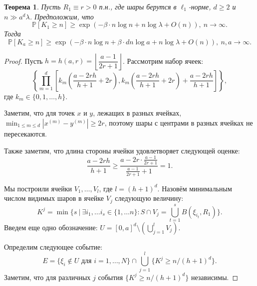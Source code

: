 \documentclass[12pt]{article}
\theoremstyle{plain}
\newtheorem{thm}{Теорема} %
\theoremstyle{definition}
\theoremstyle{remark}
\def\geq{\geqslant}
\def\leq{\leqslant}
\newcommand{\PP}{\mathbb{P}}
\begin{document}
\begin{thm}
Пусть $R_1\equiv r > 0$ п.н., где шары берутся в $\ell_1$-норме, $d\geq 2$ и $n \gg a^d\lambda$. 
Предположим, что 
\begin{equation*}
    \PP[K_1 \geq n] \geq \exp \left(-\beta\cdot n\log n + n\log\lambda + O(n)\right),\  n \to \infty.
\end{equation*}{}
Тогда 
\begin{equation*}
    \PP[K_a \geq n] \geq \exp \left(-\beta\cdot n\log n + \beta\cdot dn\log a + n\log\lambda + O(n)\right),\  n, a \to \infty.
\end{equation*}{}
\end{thm}

\begin{proof}
Пусть $h = h(a, r) = \left\lfloor\dfrac{a-1}{2r+1}\right\rfloor$. Рассмотрим набор ячеек:
\begin{equation*}
    \left\{\prod_{m = 1}^d\left[k_m\left(\dfrac{a - 2rh}{h+1} + 2r\right), k_m\left(\dfrac{a - 2rh}{h+1} + 2r\right) + \dfrac{a - 2rh}{h+1}\right]\right\},
\end{equation*}{}
где $k_m\in \{0, 1, \ldots, h\}$.

Заметим, что для точек $x$ и $y$, лежащих в разных ячейках, $\min_{1\leq m\leq d} |x^{(m)} - y^{(m)}| \geq 2r$, поэтому шары с центрами в разных ячейках не пересекаются. 

Также заметим, что длина стороны ячейки удовлетворяет следующей оценке:
\begin{equation*}
    \dfrac{a - 2rh}{h+1} \geq \dfrac{a - 2r\cdot \frac{a-1}{2r+1}}{\frac{a-1}{2r+1} + 1} = 1.
\end{equation*}{}

Мы построили ячейки $V_1, \ldots, V_l$, где $l = (h+1)^d$. Назовём минимальным числом видимых шаров в ячейке $V_j$ следующую величину:
\begin{equation*}
    K^j = \min\{s\ |\ \exists i_1, \ldots i_s \in \{1, \ldots n\} \colon S \cap V_j = \bigcup_{t = 1}^s B(\xi_{i_t}, R_1) \}.
\end{equation*}{}
Введем еще одно обозначение: $U = [0,a]^d \setminus (\bigcup_{j=1}^l V_j)$.

Определим следующее событие:
\begin{equation*}
    E = \{\xi_i \not\in U \text{ для } i = 1, \ldots, N\} \cap \bigcup_{j = 1}^l\{K^j \geq n/(h+1)^d\}.
\end{equation*}{}
Заметим, что для различных $j$ события $\{K^j \geq n/(h+1)^d\}$ независимы.


\end{proof}
\end{document}
